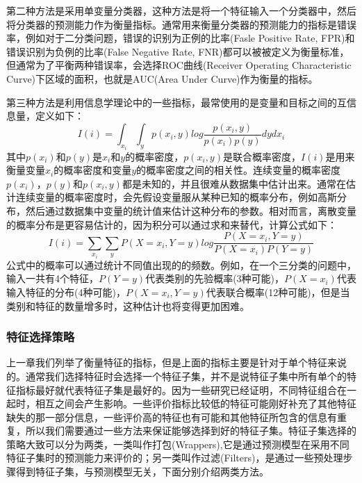 第二种方法是采用单变量分类器，这种方法是将一个特征输入一个分类器中，然后将分类器的预测能力作为衡量指标。通常用来衡量分类器的预测能力的指标是错误率，例如对于二分类问题，错误的识别为正例的比率(Fasle Positive Rate, FPR)和错误识别为负例的比率(False Negative Rate, FNR)都可以被被定义为衡量标准，但通常为了平衡两种错误率，会选择ROC曲线(Receiver Operating Characteristic Curve)下区域的面积，也就是AUC(Area Under Curve)作为衡量的指标。

第三种方法是利用信息学理论中的一些指标，最常使用的是变量和目标之间的互信息量，定义如下：
\begin{equation}
\label{equ:mutual_info}
    I(i) = \int_{x_i}\int_{y}p(x_i, y)log\frac{p(x_i, y)}{p(x_i)p(y)}dydx_i
\end{equation}
其中$p(x_i)$和$p(y)$是$x_i$和$y$的概率密度，$p(x_i, y)$是联合概率密度，$I(i)$是用来衡量变量$x_i$的概率密度和变量$y$的概率密度之间的相关性。连续变量的概率密度$p(x_i)$，$p(y)$和$p(x_i, y)$都是未知的，并且很难从数据集中估计出来。通常在估计连续变量的概率密度时，会先假设变量服从某种已知的概率分布，例如高斯分布，然后通过数据集中变量的统计值来估计这种分布的参数。相对而言，离散变量的概率分布是更容易估计的，因为积分可以通过求和来替代，计算公式如下：
\begin{equation}
\label{equ:mutual_info_discrete}
    I(i) = \sum_{x_i}\sum_{y}P(X=x_i, Y=y)log\frac{P(X=x_i, Y=y)}{P(X=x_i)P(Y=y)}
\end{equation}
公式中的概率可以通过统计不同值出现的的频数。例如，在一个三分类的问题中，输入一共有4个特征，$P(Y=y)$代表类别的先验概率(3种可能)，$P(X=x_i)$代表输入特征的分布(4种可能)，$P(X=x_i, Y=y)$代表联合概率(12种可能)，但是当类别和特征的数量增多时，这种估计也将变得更加困难。

\subsubsection{特征选择策略}
\label{sssec:feature_select_scheme}
上一章我们列举了衡量特征的指标，但是上面的指标主要是针对于单个特征来说的。通常我们选择特征时会选择一个特征子集，并不是说特征子集中所有单个的特征指标最好就代表特征子集是最好的。因为一些研究已经证明，不同特征组合在一起时，相互之间会产生影响。一些评价指标比较低的特征可能刚好补充了其他特征缺失的那一部分信息，一些评价高的特征也有可能和其他特征所包含的信息有重复，所以我们需要通过一些方法来保证能够选择到好的特征子集。特征子集选择的策略大致可以分为两类，一类叫作打包(Wrappers),它是通过预测模型在采用不同特征子集时的预测能力来评价的；另一类叫作过滤(Filters)，是通过一些预处理步骤得到特征子集，与预测模型无关，下面分别介绍两类方法。

